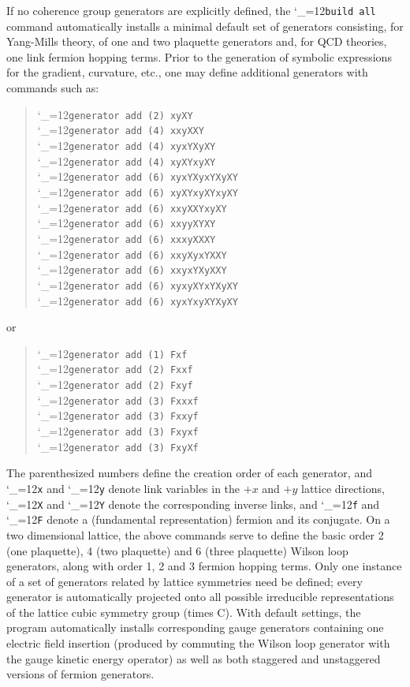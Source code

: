 \documentclass [12pt]{article}
\makeatletter
\renewcommand{\tt}{\begingroup\catcode`_=12\def\_{\string_}\tt@}
\newcommand{\tt@}[1]{\texttt{#1}\endgroup}
\makeatother
\begin{document}
If no coherence group generators are explicitly defined,
the \tt{build all} command automatically installs a minimal default
set of generators consisting, for Yang-Mills theory,
of one and two plaquette generators and, for QCD theories, 
one link fermion hopping terms.
Prior to the generation of symbolic expressions for the gradient, curvature, etc.,
one may define additional generators with commands such as:
\begin{quote}
  \tt{generator add (2) xyXY}
\\\tt{generator add (4) xxyXXY}
\\\tt{generator add (4) xyxYXyXY}
\\\tt{generator add (4) xyXYxyXY}
\\\tt{generator add (6) xyxYXyxYXyXY}
\\\tt{generator add (6) xyXYxyXYxyXY}
\\\tt{generator add (6) xxyXXYxyXY}
\\\tt{generator add (6) xxyyXYXY}
\\\tt{generator add (6) xxxyXXXY}
\\\tt{generator add (6) xxyXyxYXXY}
\\\tt{generator add (6) xxyxYXyXXY}
\\\tt{generator add (6) xyxyXYxYXyXY}
\\\tt{generator add (6) xyxYxyXYXyXY}
\end{quote}
or
\begin{quote}
  \tt{generator add (1) Fxf}
\\\tt{generator add (2) Fxxf}
\\\tt{generator add (2) Fxyf}
\\\tt{generator add (3) Fxxxf}
\\\tt{generator add (3) Fxxyf}
\\\tt{generator add (3) Fxyxf}
\\\tt{generator add (3) FxyXf}
\end{quote}
The parenthesized numbers define the creation order of each generator,
and \tt{x} and \tt{y} denote link variables in the $+x$ and $+y$
lattice directions, \tt{X} and \tt{Y} denote the corresponding
inverse links,
and \tt{f} and \tt{F} denote a (fundamental representation) fermion
and its conjugate.
On a two dimensional lattice, the above commands serve to define
the basic order 2 (one plaquette), 4 (two plaquette) and 6 (three plaquette)
Wilson loop generators,
along with
order 1, 2 and 3 fermion hopping terms.
Only one instance of a set of generators related by lattice symmetries need be defined;
every generator is automatically projected onto all possible
irreducible representations of the lattice cubic symmetry group (times C).
With default settings, the program automatically installs corresponding gauge generators 
containing one electric field insertion (produced by commuting the Wilson loop
generator with the gauge kinetic energy operator) as well as both staggered
and unstaggered versions of fermion generators.
\end{document}
